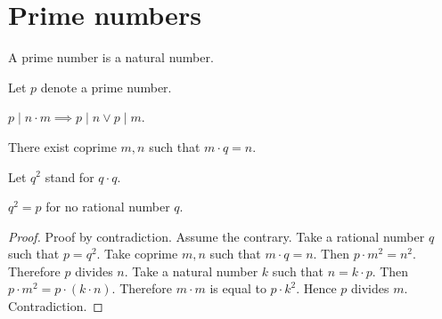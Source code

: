 \documentclass{article}
\begin{document}
  \section*{Prime numbers}

  \begin{forthel}
    \begin{signature}
      A prime number is a natural number.
    \end{signature}

    Let $p$ denote a prime number.

    \begin{axiom}
      $p \mid n \cdot m \implies p \mid n \vee p \mid m$.
    \end{axiom}

    \begin{axiom}
      There exist coprime $m,n$ such that $m \cdot q = n$.
    \end{axiom}

    Let $q^{2}$ stand for $q \cdot q$.

    \begin{proposition}
      $q^{2} = p$ for no rational number $q$.
    \end{proposition}
    \begin{proof}
      Proof by contradiction. Assume the contrary. Take a rational number $q$ such that $p = q^{2}$. Take coprime $m,n$ such that $m \cdot q = n$. Then $p \cdot m^{2} = n^{2}$. Therefore $p$ divides $n$. Take a natural number $k$ such that $n = k \cdot p$. Then $p \cdot m^{2} = p \cdot (k \cdot n)$. Therefore $m \cdot m$ is equal to $p \cdot k^{2}$. Hence $p$ divides $m$. Contradiction.
    \end{proof}
  \end{forthel}
\end{document}
